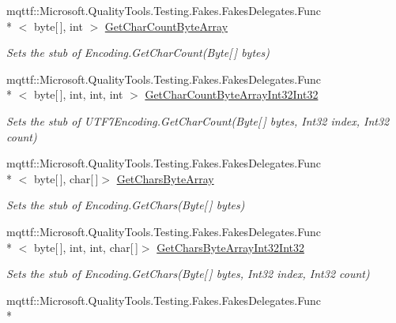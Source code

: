 \begin{DoxyCompactItemize}
mqttf\-::\-Microsoft.\-Quality\-Tools.\-Testing.\-Fakes.\-Fakes\-Delegates.\-Func\\*
$<$ byte\mbox{[}$\,$\mbox{]}, int $>$ \hyperlink{class_system_1_1_text_1_1_fakes_1_1_stub_u_t_f7_encoding_accbdc42a135380a55b0f58569c93c24e}{Get\-Char\-Count\-Byte\-Array}
\begin{DoxyCompactList}\small\item\em Sets the stub of Encoding.\-Get\-Char\-Count(\-Byte\mbox{[}$\,$\mbox{]} bytes)\end{DoxyCompactList}\item 
mqttf\-::\-Microsoft.\-Quality\-Tools.\-Testing.\-Fakes.\-Fakes\-Delegates.\-Func\\*
$<$ byte\mbox{[}$\,$\mbox{]}, int, int, int $>$ \hyperlink{class_system_1_1_text_1_1_fakes_1_1_stub_u_t_f7_encoding_a3cb8eb1cb6572e14e0da37693b2c80de}{Get\-Char\-Count\-Byte\-Array\-Int32\-Int32}
\begin{DoxyCompactList}\small\item\em Sets the stub of U\-T\-F7\-Encoding.\-Get\-Char\-Count(\-Byte\mbox{[}$\,$\mbox{]} bytes, Int32 index, Int32 count)\end{DoxyCompactList}\item 
mqttf\-::\-Microsoft.\-Quality\-Tools.\-Testing.\-Fakes.\-Fakes\-Delegates.\-Func\\*
$<$ byte\mbox{[}$\,$\mbox{]}, char\mbox{[}$\,$\mbox{]}$>$ \hyperlink{class_system_1_1_text_1_1_fakes_1_1_stub_u_t_f7_encoding_a45784701b113e5fe98aa9cae8f793c8e}{Get\-Chars\-Byte\-Array}
\begin{DoxyCompactList}\small\item\em Sets the stub of Encoding.\-Get\-Chars(\-Byte\mbox{[}$\,$\mbox{]} bytes)\end{DoxyCompactList}\item 
mqttf\-::\-Microsoft.\-Quality\-Tools.\-Testing.\-Fakes.\-Fakes\-Delegates.\-Func\\*
$<$ byte\mbox{[}$\,$\mbox{]}, int, int, char\mbox{[}$\,$\mbox{]}$>$ \hyperlink{class_system_1_1_text_1_1_fakes_1_1_stub_u_t_f7_encoding_aa067e06076b0130f5872c63f892f2239}{Get\-Chars\-Byte\-Array\-Int32\-Int32}
\begin{DoxyCompactList}\small\item\em Sets the stub of Encoding.\-Get\-Chars(\-Byte\mbox{[}$\,$\mbox{]} bytes, Int32 index, Int32 count)\end{DoxyCompactList}\item 
mqttf\-::\-Microsoft.\-Quality\-Tools.\-Testing.\-Fakes.\-Fakes\-Delegates.\-Func\\*

\end{DoxyCompactItemize}
